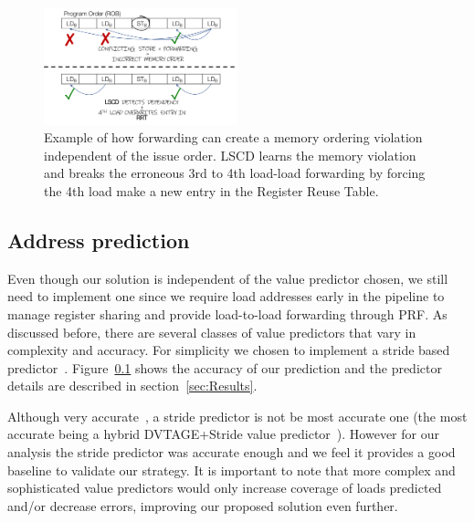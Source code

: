 \documentclass{sig-alternate}
\begin{document}
\begin{figure}[ht]
\centerline{\includegraphics[width=0.50\textwidth]{diagrams/LSCD.pdf}}
\caption{Example of how forwarding can create a memory ordering violation independent of the issue order. LSCD learns the memory violation and breaks the erroneous 3rd to 4th load-load forwarding by forcing the 4th load make a new entry in the Register Reuse Table.}
\label{fig:LSCD}
\end{figure}



\subsection{Address prediction}
Even though our solution is independent of the value predictor chosen, we still need to implement one since we require load addresses early in the pipeline to manage register sharing and provide load-to-load forwarding through PRF. As discussed before, there are several classes of value predictors that vary in complexity and accuracy. For simplicity we chosen to implement a stride based predictor~\cite{}. Figure~\ref{} shows the accuracy of our prediction and the predictor details are described in section~\ref{sec:Results}. 

Although very accurate~\cite{}, a stride predictor is not be most accurate one (the most accurate being a hybrid DVTAGE+Stride value predictor~\cite{}). However for our analysis the stride predictor was accurate enough and we feel it provides a good baseline to validate our strategy. It is important to note that more complex and sophisticated value predictors would only increase coverage of loads predicted and/or decrease errors, improving our proposed solution even further.  
\end{document}
